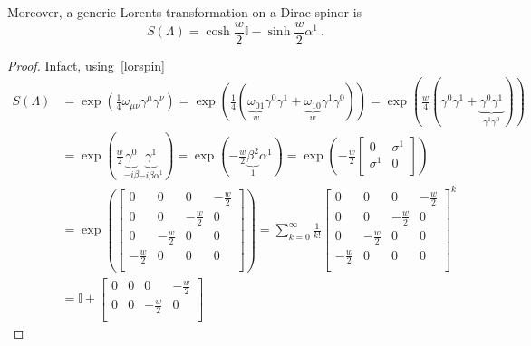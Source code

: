 \begin{example}
        Moreover, a generic Lorents transformation on a Dirac spinor is 
        \begin{equation}\label{loridrac}
            S(\Lambda) = \cosh \frac{w}{2} \mathbb I - \sinh \frac{w}{2} \alpha^1 ~.
        \end{equation}
        \begin{proof}
            Infact, using~\eqref{lorspin}
            \begin{equation*}
            \begin{aligned}
                S(\Lambda) & = \exp(\frac{1}{4} \omega_{\mu\nu} \gamma^\mu \gamma^\nu) = \exp(\frac{1}{4} (\underbrace{\omega_{01}}_w \gamma^0 \gamma^1 + \underbrace{\omega_{10}}_w \gamma^1 \gamma^0 )) = \exp(\frac{w}{4} (\gamma^0 \gamma^1 + \underbrace{\gamma^0 \gamma^1}_{\gamma^1 \gamma^0} )) \\ & = \exp(\frac{w}{2} \underbrace{\gamma^0}_{-i \beta} \underbrace{\gamma^1}_{- i \beta \alpha^1}) = \exp(- \frac{w}{2} \underbrace{\beta^2}_1 \alpha^1) = \exp(- \frac{w}{2} \begin{bmatrix}
                    0 & \sigma^1 \\ \sigma^1 & 0 \\
                \end{bmatrix}) \\ & = \exp(\begin{bmatrix}
                    0 & 0 & 0 & - \frac{w}{2} \\
                    0 & 0 & - \frac{w}{2} & 0 \\
                    0 & - \frac{w}{2} & 0 & 0 \\
                    - \frac{w}{2} & 0 & 0 & 0 \\
                \end{bmatrix}) = \sum_{k = 0}^{\infty} \frac{1}{k!} \begin{bmatrix}
                    0 & 0 & 0 & - \frac{w}{2} \\
                    0 & 0 & - \frac{w}{2} & 0 \\
                    0 & - \frac{w}{2} & 0 & 0 \\
                    - \frac{w}{2} & 0 & 0 & 0 \\
                \end{bmatrix}^k \\ & = \mathbb I + \begin{bmatrix}
                    0 & 0 & 0 & - \frac{w}{2} \\
                    0 & 0 & - \frac{w}{2} & 0 \\

\end{bmatrix}
\end{aligned}
\end{equation*}
\end{proof}
\end{example}
